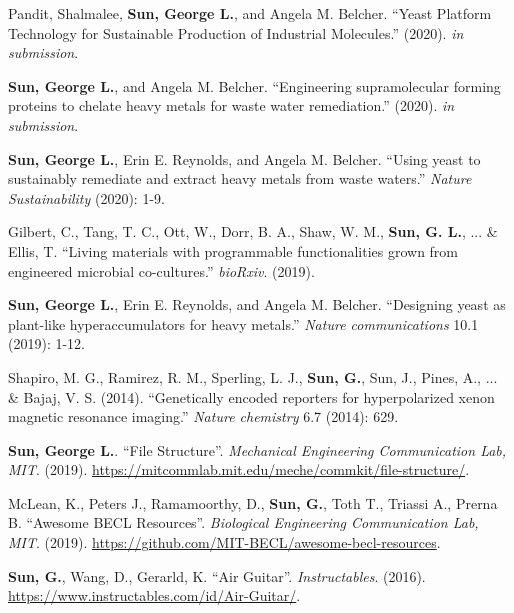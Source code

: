

\begin{cvparagraph}
Pandit, Shalmalee, \textbf{Sun, George L.}, and Angela M. Belcher. ``Yeast Platform Technology for Sustainable Production of Industrial Molecules.'' (2020). \textit{in submission}.

\textbf{Sun, George L.}, and Angela M. Belcher. ``Engineering supramolecular forming proteins to chelate heavy metals for waste water remediation.'' (2020). \textit{in submission}.

\textbf{Sun, George L.}, Erin E. Reynolds, and Angela M. Belcher. ``Using yeast to sustainably remediate and extract heavy metals from waste waters.'' \textit{Nature Sustainability} (2020): 1-9.

Gilbert, C., Tang, T. C., Ott, W., Dorr, B. A., Shaw, W. M., \textbf{Sun, G. L.}, ... \& Ellis, T. ``Living materials with programmable functionalities grown from engineered microbial co-cultures.'' \textit{bioRxiv}. (2019).

\textbf{Sun, George L.}, Erin E. Reynolds, and Angela M. Belcher. ``Designing yeast as plant-like hyperaccumulators for heavy metals.'' \textit{Nature communications} 10.1 (2019): 1-12.

Shapiro, M. G., Ramirez, R. M., Sperling, L. J., \textbf{Sun, G.}, Sun, J., Pines, A., ... \& Bajaj, V. S. (2014). ``Genetically encoded reporters for hyperpolarized xenon magnetic resonance imaging.'' \textit{Nature chemistry} 6.7 (2014): 629.

\end{cvparagraph}


\begin{cvparagraph}
\textbf{Sun, George L.}. ``File Structure''. \textit{Mechanical Engineering Communication Lab, MIT}. (2019). \newline
\url{https://mitcommlab.mit.edu/meche/commkit/file-structure/}.

McLean, K., Peters J., Ramamoorthy, D., \textbf{Sun, G.}, Toth T., Triassi A., Prerna B. ``Awesome BECL Resources''. \textit{Biological Engineering Communication Lab, MIT}. (2019). \url{https://github.com/MIT-BECL/awesome-becl-resources}.

\textbf{Sun, G.}, Wang, D., Gerarld, K. ``Air Guitar''. \textit{Instructables}. (2016). \newline
\url{https://www.instructables.com/id/Air-Guitar/}.

\end{cvparagraph}
